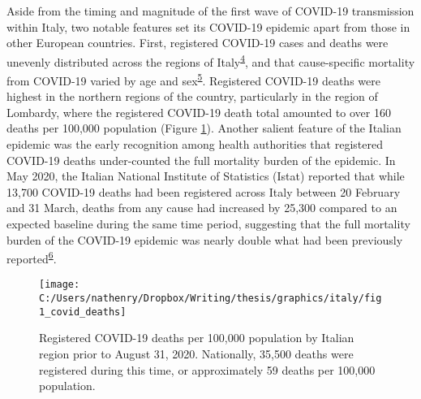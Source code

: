 \documentclass[
]{article}
\begin{document}
Aside from the timing and magnitude of the first wave of COVID-19 transmission within Italy, two notable features set its COVID-19 epidemic apart from those in other European countries. First, registered COVID-19 cases and deaths were unevenly distributed across the regions of Italy\textsuperscript{\protect\hyperlink{ref-LaMaestra2020}{4}}⁠, and that cause-specific mortality from COVID-19 varied by age and sex\textsuperscript{\protect\hyperlink{ref-Albitar2020}{5}}⁠. Registered COVID-19 deaths were highest in the northern regions of the country, particularly in the region of Lombardy, where the registered COVID-19 death total amounted to over 160 deaths per 100,000 population (Figure \ref{fig:covid-deaths}). Another salient feature of the Italian epidemic was the early recognition among health authorities that registered COVID-19 deaths under-counted the full mortality burden of the epidemic. In May 2020, the Italian National Institute of Statistics (Istat) reported that while 13,700 COVID-19 deaths had been registered across Italy between 20 February and 31 March, deaths from any cause had increased by 25,300 compared to an expected baseline during the same time period, suggesting that the full mortality burden of the COVID-19 epidemic was nearly double what had been previously reported\textsuperscript{\protect\hyperlink{ref-Mannucci2020}{6}}.

\begin{figure}[!hbt]

{\centering \texttt{[image: C:/Users/nathenry/Dropbox/Writing/thesis/graphics/italy/fig1\_covid\_deaths]} 

}

\caption{Registered COVID-19 deaths per 100,000 population by Italian region prior to August 31, 2020. Nationally, 35,500 deaths were registered during this time, or approximately 59 deaths per 100,000 population.}\label{fig:covid-deaths}
\end{figure}
\end{document}
